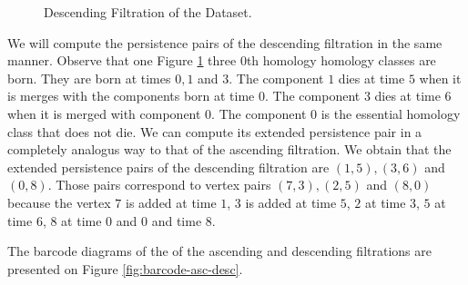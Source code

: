 \begin{figure}[h]
    \qquad \qquad

    \caption{Descending Filtration of the Dataset.}%
    \label{fig:desc-filtration}%
\end{figure}

We will compute the persistence pairs of the descending filtration in the same manner. Observe that one Figure \ref{fig:desc-filtration} three 0th homology homology classes are born. They are born at times $0, 1$ and $3$. The component $1$ dies at time $5$ when it is merges with the components born at time $0$. The component $3$ dies at time $6$ when it is merged with component $0$. The component $0$ is the essential homology class that does not die. We can compute its extended persistence pair in a completely analogus way to that of the ascending filtration. We obtain that the extended persistence pairs of the descending filtration are $(1, 5), (3, 6)$ and $(0, 8)$. Those pairs correspond to vertex pairs $(7, 3), (2, 5)$ and $(8, 0)$
because the vertex $7$ is added at time $1$, $3$ is added at time $5$, $2$ at time $3$, $5$ at time $6$, $8$ at time $0$ and $0$ and time $8$.

The barcode diagrams of the of the ascending and descending filtrations are presented on Figure \ref{fig:barcode-asc-desc}.


